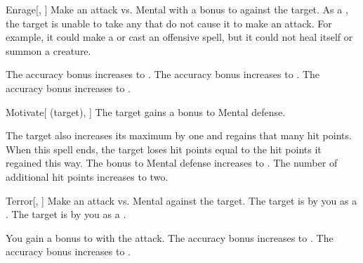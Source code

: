\lowercase{\hypertarget{spell:Enrage}{}}\label{spell:Enrage}
\begin{freeability}[Rank 1]{\hypertarget{spell:Enrage}{Enrage}}[, ]
Make an attack vs. Mental with a  bonus to  against the target.
\hit As a , the target is unable to take any  that do not cause it to make an attack.
For example, it could make a  or cast an offensive spell, but it could not heal itself or summon a creature.

\rankline
{} The accuracy bonus increases to .
 The accuracy bonus increases to .
 The accuracy bonus increases to .
\end{freeability}
\vspace{0.25em}



\lowercase{\hypertarget{spell:Motivate}{}}\label{spell:Motivate}
\begin{attuneability}[Rank 1]{\hypertarget{spell:Motivate}{Motivate}}[ (target), ]
The target gains a  bonus to Mental defense.

\rankline
{} The target also increases its maximum  by one and regains that many hit points.
When this spell ends, the target loses hit points equal to the hit points it regained this way.
 The bonus to Mental defense increases to .
 The number of additional hit points increases to two.
\end{attuneability}
\vspace{0.25em}



\lowercase{\hypertarget{spell:Terror}{}}\label{spell:Terror}
\begin{freeability}[Rank 1]{\hypertarget{spell:Terror}{Terror}}[, ]
Make an attack vs. Mental against the target.
\hit The target is \shaken by you as a .
\crit The target is  by you as a .

\rankline
{} You gain a  bonus to  with the attack.
 The accuracy bonus increases to .
 The accuracy bonus increases to .
\end{freeability}
\vspace{0.25em}



